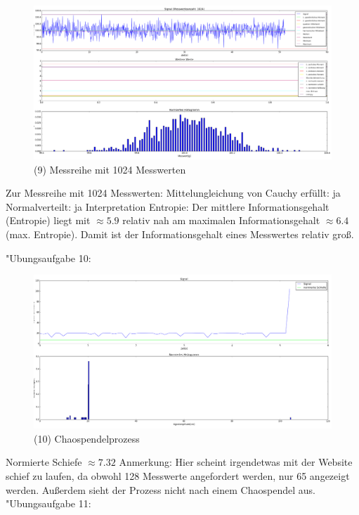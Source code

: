 \documentclass[fleqn,a4paper,12pt]{article}
\begin{document}
  \begin{figure}
    \includegraphics[width=1.0\textwidth]{A09_1024.png}
    \caption{(9) Messreihe mit 1024 Messwerten}
  \end{figure}
  Zur Messreihe mit 1024 Messwerten: \newline
  Mittelungleichung von Cauchy erfüllt: ja \newline
  Normalverteilt: ja \newline
  Interpretation Entropie: Der mittlere Informationsgehalt (Entropie) liegt mit $\approx 5.9$ relativ nah am maximalen Informationsgehalt $\approx 6.4$ (max. Entropie).
  Damit ist der Informationsgehalt eines Messwertes relativ groß. \newpage

  "Ubungsaufgabe 10: \newline
  \begin{figure}
    \includegraphics[width=1.0\textwidth]{A10.png}
    \caption{(10) Chaospendelprozess}
  \end{figure}
  Normierte Schiefe $\approx 7.32$ \newline
  Anmerkung: Hier scheint irgendetwas mit der Website schief zu laufen, da obwohl 128 Messwerte angefordert werden, nur 65 angezeigt werden.
  Außerdem sieht der Prozess nicht nach einem Chaospendel aus.
\newpage
  "Ubungsaufgabe 11:\newline
\end{document}
